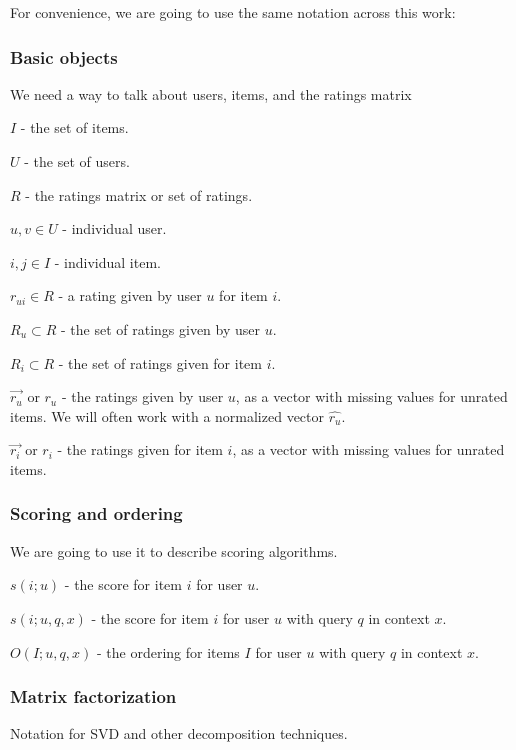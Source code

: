 \documentclass[11pt]{article}
\begin{document}
    For convenience, we are going to use the same notation across this work:

    \subsubsection{Basic objects}\label{basic-objects}

    We need a way to talk about users, items, and the ratings matrix

\(I\) - the set of items.

\(U\) - the set of users.

\(R\) - the ratings matrix or set of ratings.

\(u, v \in U\) - individual user.

\(i, j \in I\) - individual item.

\(r_{ui} \in R\) - a rating given by user \(u\) for item \(i\).

\(R_{u} \subset R\) - the set of ratings given by user \(u\).

\(R_{i} \subset R\) - the set of ratings given for item \(i\).

\(\vec{r_{u}}\) or \(r_{u}\) - the ratings given by user \(u\), as a
vector with missing values for unrated items. We will often work with a
normalized vector \(\hat{r_{u}}\).

\(\vec{r_{i}}\) or \(r_{i}\) - the ratings given for item \(i\), as a
vector with missing values for unrated items.

    \subsubsection{Scoring and ordering}\label{scoring-and-ordering}

    We are going to use it to describe scoring algorithms.

\(s(i; u)\) - the score for item \(i\) for user \(u\).

\(s(i; u,q,x)\) - the score for item \(i\) for user \(u\) with query
\(q\) in context \(x\).

\(O(I; u,q,x)\) - the ordering for items \(I\) for user \(u\) with query
\(q\) in context \(x\).

    \subsubsection{Matrix factorization}\label{matrix-factorization}

    Notation for SVD and other decomposition techniques.
\end{document}
